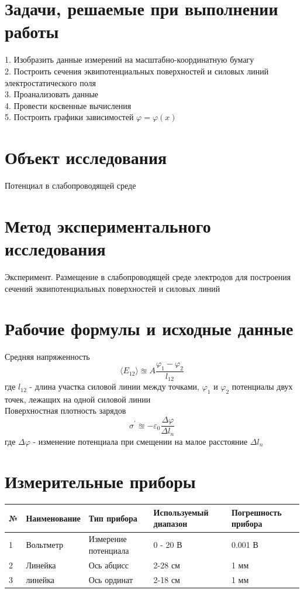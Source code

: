\documentclass[12pt]{extarticle}
\begin{document}
    \section{Задачи, решаемые при выполнении работы}
    1. Изобразить данные измерений на масштабно-координатную бумагу
    \\2. Построить сечения эквипотенциальных поверхностей и силовых линий электростатического поля
    \\3. Проанализовать данные
    \\4. Провести косвенные вычисления
    \\5. Построить графики зависимостей $\varphi = \varphi(x)$
    
    \section{Объект исследования}
    Потенциал в слабопроводящей среде

    \section{Метод экспериментального исследования}
    Эксперимент. Размещение в слабопроводящей среде электродов для построения сечений эквипотенциальных поверхностей и силовых линий

    \section{Рабочие формулы и исходные данные}
    
    Средняя напряженность
    \begin{equation*}
        \langle E_{12} \rangle \approxeq A \frac{\varphi_1 - \varphi_2}{l_{12}}
    \end{equation*}
    где $l_{12}$ - длина участка силовой линии между точками, 
    $\varphi_1$ и $\varphi_2$ потенциалы двух точек, лежащих на одной силовой линии
    \\
    Поверхностная плотность зарядов
    \begin{equation*}
        \sigma^\prime \approxeq -\varepsilon_0 \frac{\Delta\varphi}{\Delta l_n}
    \end{equation*}
    где $\Delta\varphi$ - изменение потенциала при смещении на малое расстояние $\Delta l_n$
    \section{Измерительные приборы}
    \begin{tabular}{|p{1cm}|p{4cm}|p{5cm}|p{3cm}|p{3cm}|}
        \hline
        \textbf{№} & \textbf{Наименование} & \textbf{Тип прибора} & \textbf{Используемый диапазон} & \textbf{Погрешность прибора} \\ \hline
        1 & Вольтметр & Измерение потенциала & 0 - 20 В & 0.001 В \\ \hline
        2 & Линейка & Ось абцисс & 2-28 см & 1 мм \\ \hline
        3 & линейка & Ось ординат & 2-18 см & 1 мм \\
        \hline
    \end{tabular}
    
\end{document}
